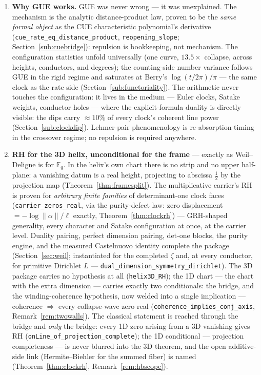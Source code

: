 \documentclass[11pt]{article}
\newcommand{\code}[1]{\texttt{#1}}
\begin{document}
\begin{enumerate}[label=\textup{(\Roman*)}]
\item \textbf{Why GUE works.}  GUE was never wrong --- it was unexplained.  The mechanism is the
analytic distance-product law, proven to be the \emph{same formal object} as the CUE
characteristic polynomial's derivative (\code{cue\_rate\_eq\_distance\_product},
\code{reopening\_slope}; Section~\ref{sub:cuebridge}): repulsion is bookkeeping, not mechanism.
The configuration statistics unfold universally (one curve, $13.5\times$ collapse, across heights,
conductors, and degrees); the counting-side number variance follows GUE in the rigid regime and
saturates at Berry's $\log(t/2\pi)/\pi$ --- the same clock as the rate side
(Section~\ref{sub:functoriality}).  The arithmetic never touches the configuration: it lives in
the medium --- Euler clocks, Satake weights, conductor holes --- where the explicit-formula
duality is directly visible: the dips carry ${\approx}10\%$ of every clock's coherent line power
(Section~\ref{sub:clockdip}).  Lehmer-pair phenomenology is re-absorption timing in the crossover
regime; no repulsion is required anywhere.

\item \textbf{RH for the 3D helix, unconditional for the frame} --- exactly as Weil--Deligne is
for $\mathbb{F}_q$.  In the helix's own chart there is no strip and no upper half-plane: a
vanishing datum is a real height, projecting to abscissa $\tfrac12$ by the projection map
(Theorem~\ref{thm:framesplit}).  The multiplicative carrier's RH is proven for \emph{arbitrary
finite families} of determinant-one clock faces (\code{carrier\_zeros\_real}, via the
purity-defect law: zero displacement $=-\log\|\alpha\|/\ell$ exactly, Theorem~\ref{thm:clockrh})
--- GRH-shaped generality, every character and Satake configuration at once, at the carrier
level.  Duality pairing, perfect dimension pairing, det-one blocks, the purity engine, and the
measured Castelnuovo identity complete the package (Section~\ref{sec:weil}; instantiated for the
completed $\zeta$ and, at every conductor, for primitive Dirichlet $L$ ---
\code{dual\_dimension\_symmetry\_dirichlet}).  The 3D package carries no hypothesis at all
(\code{helix3D\_RH}); the 1D chart --- the chart with the extra dimension --- carries exactly two
conditionals: the bridge, and the winding-coherence hypothesis, now welded into a single
implication --- coherence $\Rightarrow$ every collapse-wave zero real
(\code{coherence\_implies\_conj\_axis}, Remark~\ref{rem:twowalls}).  The classical
statement is reached through the bridge and \emph{only} the bridge: every 1D zero arising from a
3D vanishing gives RH (\code{onLine\_of\_projection\_complete}); the 1D conditional --- projection completeness
--- is never blurred into the 3D theorem, and the open additive-side link (Hermite--Biehler for
the summed fiber) is named (Theorem~\ref{thm:clockrh}, Remark~\ref{rem:hbscope}).
\end{enumerate}
\end{document}
